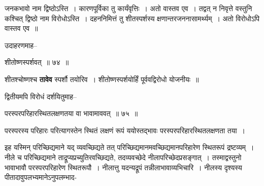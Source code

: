 \documentclass[article,12pt,a4paper]{memoir}
\begin{document}
	  \pstart जनकभावो नाम द्विष्ठोऽस्ति । कारणपूर्विका तु कार्यंवृत्तिः । अतो वास्तव एव । तद्वत् न निवृत्ते वस्तुनि कश्चित् द्विष्ठो नाम विरोधोऽस्ति । दहननिमित्तं तु शीतस्पर्शस्य क्षणान्तरजननासामर्थ्यम् । अतो विरोधोऽपि वास्तव एव ॥
	\pend
        

	  \pstart उदाहरणमाह--
	\pend
        
	  \bigskip
	  \begingroup
	

	  \pstart शीतोष्णस्पर्शवत् ॥ ७४ ॥
	\pend
      
	  \endgroup
	 

	  \pstart {}शीतश्चोष्णश्च \textbf{तावेव} स्पर्शौ तयोरिव । शीतोष्णस्पर्शयोर्हिं पूर्ववद्विरोधो योजनीयः ॥
	\pend
        

	  \pstart द्वितीयमपि विरोधं दर्शयितुमाह--
	\pend
        
	  \bigskip
	  \begingroup
	

	  \pstart परस्परपरिहारस्थितलक्षणतया वा भावामाववत् ॥ ७५ ॥
	\pend
      
	  \endgroup
	 

	  \pstart परस्परस्य परिहारः परित्यागस्तेन स्थितं लक्षणं रूपं ययोस्तद्भावः परस्परपरिहारस्थितलक्षणता तया ।
	\pend
        

	  \pstart इह यस्मिन् परिच्छिद्यमाने यद् व्यवच्छिद्यते तत् परिच्छिद्यमानमवच्छिद्यमानपरिहारेण स्थितरूपं द्रष्टव्यम् । नीले च परिच्छिद्यमाने ताद्रूप्यप्रच्युतिरवच्छिद्यते, तदव्यवच्छेदे नीलापरिच्छेदप्रसङ्गात् । तस्माद्वस्तुनो भावाभावौ परस्परपरिहारेण स्थितरूपौ । नीलात्तु यदन्यद्रूपं तन्नीलाभावाव्यभिचारि । नीलस्य दृश्यस्य पीतादावुपलभ्यमानेऽनुपलम्भाद-
	\pend
      
\end{document}
